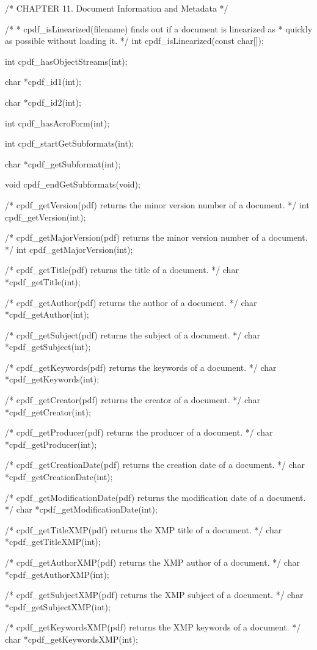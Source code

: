 /* CHAPTER 11. Document Information and Metadata */

/*
 * cpdf_isLinearized(filename) finds out if a document is linearized as
 * quickly as possible without loading it.
 */
int cpdf_isLinearized(const char[]);

int cpdf_hasObjectStreams(int);

char *cpdf_id1(int);

char *cpdf_id2(int);

int cpdf_hasAcroForm(int);

int cpdf_startGetSubformats(int);

char *cpdf_getSubformat(int);

void cpdf_endGetSubformats(void);

/* cpdf_getVersion(pdf) returns the minor version number of a document. */
int cpdf_getVersion(int);

/* cpdf_getMajorVersion(pdf) returns the minor version number of a document. */
int cpdf_getMajorVersion(int);

/* cpdf_getTitle(pdf) returns the title of a document. */
char *cpdf_getTitle(int);

/* cpdf_getAuthor(pdf) returns the author of a document. */
char *cpdf_getAuthor(int);

/* cpdf_getSubject(pdf) returns the subject of a document. */
char *cpdf_getSubject(int);

/* cpdf_getKeywords(pdf) returns the keywords of a document. */
char *cpdf_getKeywords(int);

/* cpdf_getCreator(pdf) returns the creator of a document. */
char *cpdf_getCreator(int);

/* cpdf_getProducer(pdf) returns the producer of a document. */
char *cpdf_getProducer(int);

/* cpdf_getCreationDate(pdf) returns the creation date of a document. */
char *cpdf_getCreationDate(int);

/* cpdf_getModificationDate(pdf) returns the modification date of a document. */
char *cpdf_getModificationDate(int);

/* cpdf_getTitleXMP(pdf) returns the XMP title of a document. */
char *cpdf_getTitleXMP(int);

/* cpdf_getAuthorXMP(pdf) returns the XMP author of a document. */
char *cpdf_getAuthorXMP(int);

/* cpdf_getSubjectXMP(pdf) returns the XMP subject of a document. */
char *cpdf_getSubjectXMP(int);

/* cpdf_getKeywordsXMP(pdf) returns the XMP keywords of a document. */
char *cpdf_getKeywordsXMP(int);

